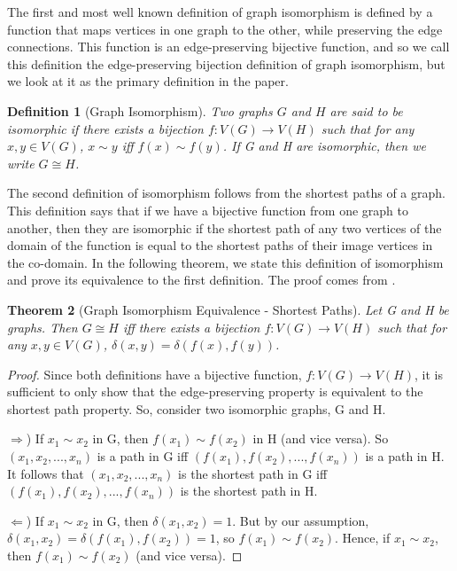 \documentclass[12pt]{article}
\newtheorem{thm}{Theorem}[section]
\newtheorem{defn}[thm]{Definition}
\begin{document}
The first and most well known definition of graph isomorphism is defined by a function that maps vertices in one graph to the other, while preserving the edge connections. This function is an edge-preserving bijective function, and so we call this definition the edge-preserving bijection definition of graph isomorphism, but we look at it as the primary definition in the paper.
\begin{defn}[Graph Isomorphism]
Two graphs $G$ and $H$ are said to be isomorphic if there exists a bijection $f:V(G) \to V(H)$ such that for any $x, y \in V(G)$, $x \sim y$ iff $f(x) \sim f(y)$. If G and H are isomorphic, then we write $G \cong H$.
\end{defn}

The second definition of isomorphism follows from the shortest paths of a graph. This definition says that if we have a bijective function from one graph to another, then they are isomorphic if the shortest path of any two vertices of the domain of the function is equal to the shortest paths of their image vertices in the co-domain. In the following theorem, we state this definition of isomorphism and prove its equivalence to the first definition. The proof comes from \cite{shortest}.

\begin{thm}[Graph Isomorphism Equivalence - Shortest Paths]
\label{shortest}
Let G and H be graphs. Then $G \cong H$ iff there exists a bijection $f:V(G) \to V(H)$ such that for any $x, y \in V(G)$, $\delta(x, y) = \delta(f(x), f(y))$.
\end{thm}

\begin{proof}
Since both definitions have a bijective function, $f:V(G) \to V(H)$, it is sufficient to only show that the edge-preserving property is equivalent to the shortest path property. So, consider two isomorphic graphs, G and H.

$\Rightarrow$) If $x_1 \sim x_2$ in G, then $f(x_1) \sim f(x_2)$ in H (and vice versa). So $(x_1, x_2, ..., x_n)$ is a path in G iff $(f(x_1), f(x_2), ..., f(x_n))$ is a path in H. It follows that $(x_1, x_2, ..., x_n)$ is the shortest path in G iff $(f(x_1), f(x_2), ..., f(x_n))$ is the shortest path in H.

$\Leftarrow$) If $x_1 \sim x_2$ in G, then $\delta(x_1, x_2) = 1$. But by our assumption, $\delta(x_1, x_2) = \delta(f(x_1), f(x_2)) = 1$, so $f(x_1) \sim f(x_2)$. Hence, if $x_1 \sim x_2$, then $f(x_1) \sim f(x_2)$ (and vice versa).
\end{proof}
\end{document}
